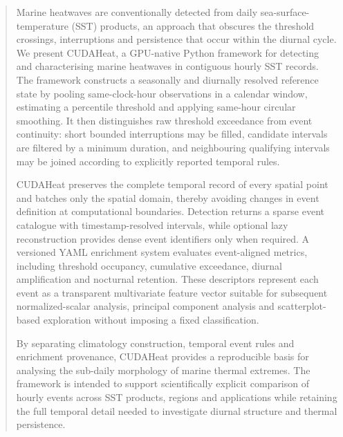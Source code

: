 \begin{abstract}
Marine heatwaves are conventionally detected from daily sea-surface-temperature (SST) products, an approach that obscures the threshold crossings, interruptions and persistence that occur within the diurnal cycle. We present CUDAHeat, a GPU-native Python framework for detecting and characterising marine heatwaves in contiguous hourly SST records. The framework constructs a seasonally and diurnally resolved reference state by pooling same-clock-hour observations in a calendar window, estimating a percentile threshold and applying same-hour circular smoothing. It then distinguishes raw threshold exceedance from event continuity: short bounded interruptions may be filled, candidate intervals are filtered by a minimum duration, and neighbouring qualifying intervals may be joined according to explicitly reported temporal rules.

CUDAHeat preserves the complete temporal record of every spatial point and batches only the spatial domain, thereby avoiding changes in event definition at computational boundaries. Detection returns a sparse event catalogue with timestamp-resolved intervals, while optional lazy reconstruction provides dense event identifiers only when required. A versioned YAML enrichment system evaluates event-aligned metrics, including threshold occupancy, cumulative exceedance, diurnal amplification and nocturnal retention. These descriptors represent each event as a transparent multivariate feature vector suitable for subsequent normalized-scalar analysis, principal component analysis and scatterplot-based exploration without imposing a fixed classification.

By separating climatology construction, temporal event rules and enrichment provenance, CUDAHeat provides a reproducible basis for analysing the sub-daily morphology of marine thermal extremes. The framework is intended to support scientifically explicit comparison of hourly events across SST products, regions and applications while retaining the full temporal detail needed to investigate diurnal structure and thermal persistence.
\end{abstract}

